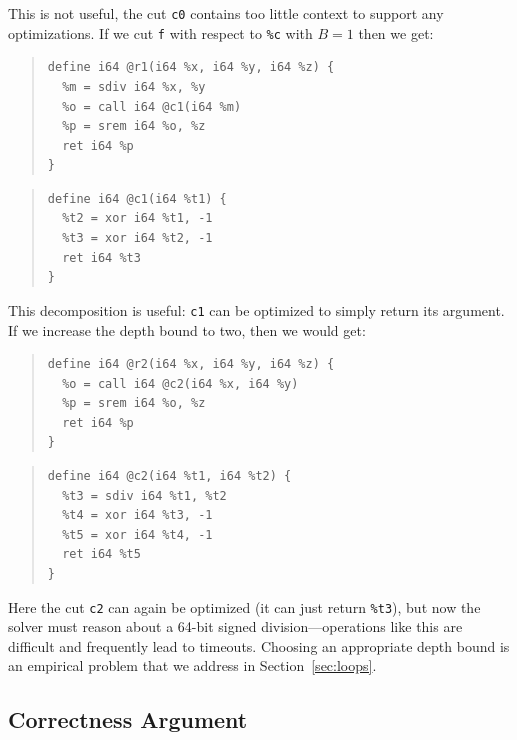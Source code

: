 This is not useful, the cut \texttt{c0} contains too little context
to support any optimizations.
%
If we cut \texttt{f} with respect to \texttt{\%c} with $B = 1$ then we get:

\begin{multicols}{2}
{\small\begin{quote}
\begin{verbatim}
define i64 @r1(i64 %x, i64 %y, i64 %z) {
  %m = sdiv i64 %x, %y
  %o = call i64 @c1(i64 %m)
  %p = srem i64 %o, %z
  ret i64 %p
}
\end{verbatim}
\end{quote}}
\columnbreak
{\small\begin{quote}
\begin{verbatim}
define i64 @c1(i64 %t1) {
  %t2 = xor i64 %t1, -1
  %t3 = xor i64 %t2, -1
  ret i64 %t3
}
\end{verbatim}
\end{quote}}
\end{multicols}

This decomposition is useful: \texttt{c1} can be optimized to simply
return its argument.
%
If we increase the depth bound to two, then we would get:

\begin{multicols}{2}
{\small\begin{quote}
\begin{verbatim}
define i64 @r2(i64 %x, i64 %y, i64 %z) {
  %o = call i64 @c2(i64 %x, i64 %y)
  %p = srem i64 %o, %z
  ret i64 %p
}
\end{verbatim}
\end{quote}}
\columnbreak
{\small\begin{quote}
\begin{verbatim}
define i64 @c2(i64 %t1, i64 %t2) {
  %t3 = sdiv i64 %t1, %t2
  %t4 = xor i64 %t3, -1
  %t5 = xor i64 %t4, -1
  ret i64 %t5
}
\end{verbatim}
\end{quote}}
\end{multicols}

Here the cut \texttt{c2} can again be optimized (it can just return
\texttt{\%t3}), but now the solver must reason about a 64-bit signed
division---operations like this are difficult and frequently lead to
timeouts.
%
Choosing an appropriate depth bound is an empirical problem that
we address in Section~\ref{sec:loops}.


\subsection{Correctness Argument}

